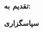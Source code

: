 \thispagestyle{empty}

\noindent
\textbf{\Large تقدیم به:}
\vskip 1cm

\newpage
\thispagestyle{empty}

\begin{center}
\textbf{\Large سپاسگزاری}
\end{center}
\vskip 1cm

